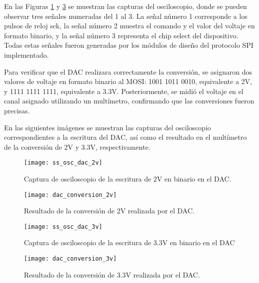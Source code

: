 En las Figuras \ref{fig:ss_osc_dac_2v} y \ref{fig:ss_osc_dac_3v} se muestran las capturas del osciloscopio, donde se pueden observar tres señales numeradas del 1 al 3. La señal número 1 corresponde a los pulsos de reloj sck, la señal número 2 muestra el comando y el valor del voltaje en formato binario, y la señal número 3 representa el chip select del dispositivo. Todas estas señales fueron generadas por los módulos de diseño del protocolo SPI implementado.


Para verificar que el DAC realizara correctamente la conversión, se asignaron dos valores de voltaje en formato binario al MOSI: 1001 1011 0010, equivalente a 2V, y 1111 1111 1111, equivalente a 3.3V. Posteriormente, se midió el voltaje en el canal asignado utilizando un multímetro, confirmando que las conversiones fueron precisas.


En las siguientes imágenes se muestran las capturas del osciloscopio correspondientes a la escritura del DAC, así como el resultado en el multímetro de la conversión de 2V y 3.3V, respectivamente.

            \begin{figure}[hbtp]
                \centering
                \texttt{[image: ss\_osc\_dac\_2v]}
                \caption{Captura de osciloscopio de la escritura de 2V en binario en el DAC.}
                \label{fig:ss_osc_dac_2v}
            \end{figure}
            
            \begin{figure}[hbtp]
                \centering
                \texttt{[image: dac\_conversion\_2v]}
                \caption{Resultado de la conversión de 2V realizada por el DAC.}
                \label{fig:dac_conversion_2v}
            \end{figure}            
          
            \begin{figure}[hbtp]
                \centering
                \texttt{[image: ss\_osc\_dac\_3v]}
                \caption{Captura de osciloscopio de la escritura de 3.3V en binario en el DAC}
                \label{fig:ss_osc_dac_3v}
            \end{figure}   

            \begin{figure}[hbtp]
                \centering
                \texttt{[image: dac\_conversion\_3v]}
                \caption{Resultado de la conversión de 3.3V realizada por el DAC.}
                \label{fig:dac_conversion_3v}
            \end{figure} 
                                 
